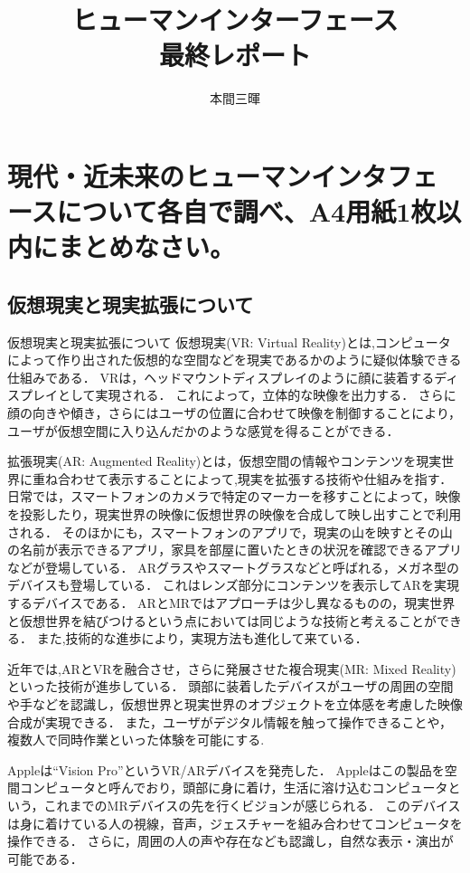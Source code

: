 \documentclass[titlepage,a4paper]{jsarticle}
\title{ヒューマンインターフェース\\最終レポート}
\author{本間三暉}
\begin{document}
\maketitle
\section{現代・近未来のヒューマンインタフェースについて各自で調べ、A4用紙1枚以内にまとめなさい。}%
\subsection*{仮想現実と現実拡張について}
仮想現実と現実拡張について
仮想現実(VR: Virtual Reality)とは\cite{VR},コンピュータによって作り出された仮想的な空間などを現実であるかのように疑似体験できる仕組みである．
VRは，ヘッドマウントディスプレイのように顔に装着するディスプレイとして実現される．
これによって，立体的な映像を出力する．
さらに顔の向きや傾き，さらにはユーザの位置に合わせて映像を制御することにより，ユーザが仮想空間に入り込んだかのような感覚を得ることができる．

拡張現実(AR: Augmented Reality)とは\cite{AR}，仮想空間の情報やコンテンツを現実世界に重ね合わせて表示することによって,現実を拡張する技術や仕組みを指す．
日常では，スマートフォンのカメラで特定のマーカーを移すことによって，映像を投影したり，現実世界の映像に仮想世界の映像を合成して映し出すことで利用される．
そのほかにも，スマートフォンのアプリで，現実の山を映すとその山の名前が表示できるアプリ，家具を部屋に置いたときの状況を確認できるアプリなどが登場している．
ARグラスやスマートグラスなどと呼ばれる，メガネ型のデバイスも登場している．
これはレンズ部分にコンテンツを表示してARを実現するデバイスである．
ARとMRではアプローチは少し異なるものの，現実世界と仮想世界を結びつけるという点においては同じような技術と考えることができる．
また,技術的な進歩により，実現方法も進化して来ている．

近年では,ARとVRを融合させ，さらに発展させた複合現実(MR: Mixed Reality)\cite{MR}といった技術が進歩している．
頭部に装着したデバイスがユーザの周囲の空間や手などを認識し，仮想世界と現実世界のオブジェクトを立体感を考慮した映像合成が実現できる．
また，ユーザがデジタル情報を触って操作できることや，複数人で同時作業といった体験を可能にする.

Appleは``Vision Pro''というVR/ARデバイスを発売した．
Appleはこの製品を空間コンピュータと呼んでおり，頭部に身に着け，生活に溶け込むコンピュータという，これまでのMRデバイスの先を行くビジョンが感じられる．
このデバイスは身に着けている人の視線，音声，ジェスチャーを組み合わせてコンピュータを操作できる．
さらに，周囲の人の声や存在なども認識し，自然な表示・演出が可能である．
\end{document}
